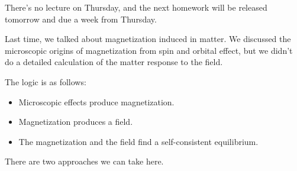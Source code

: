 \begin{note}
    There's no lecture on Thursday, and the next homework will be released tomorrow and due a week from Thursday.
\end{note}

Last time, we talked about magnetization induced in matter. We discussed the microscopic origins of magnetization from spin and orbital effect, but we didn't do a detailed calculation of the matter response to the field.

The logic is as follows:
\begin{itemize}
    \item Microscopic effects produce magnetization.
    \item Magnetization produces a field.
    \item The magnetization and the field find a self-consistent equilibrium.
\end{itemize}
There are two approaches we can take here.
